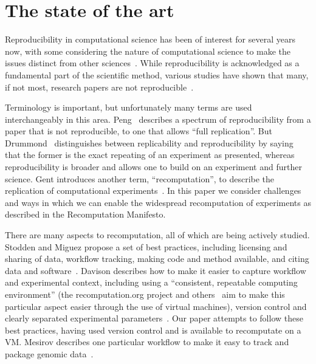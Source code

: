 \section{The state of the art}
\label{s:recomputation}

Reproducibility in computational science has been of interest for
several years now, with some considering the nature of computational
science to make the issues distinct from other
sciences~\cite{donoho:reproducible}. While reproducibility is
acknowledged as a fundamental part of the scientific method, various
studies have shown that many, if not most, research papers are not
reproducible~\cite{bonnet:repeatability,hornbaek:replications,ioannidis:repeatability}.

Terminology is important, but unfortunately many terms are used
interchangeably in this area.  Peng~\cite{peng:reproducible} describes
a spectrum of reproducibility from a paper that is not reproducible,
to one that allows ``full replication''. But
Drummond~\cite{drummond:replicability} distinguishes between
replicability and reproducibility by saying that the former is the
exact repeating of an experiment as presented, whereas reproducibility
is broader and allows one to build on an experiment and further
science. Gent introduces another term, ``recomputation'', to describe
the replication of computational experiments~\cite{gent:recomputation}.
In this paper we consider challenges and ways in which we can enable
the widespread recomputation of experiments as described in the
Recomputation Manifesto.

There are many aspects to recomputation, all of which are being
actively studied. Stodden and Miguez propose a set of best practices,
including licensing and sharing of data, workflow tracking, making
code and method available, and citing data and
software~\cite{stodden:practices}. Davison describes how to make it
easier to capture workflow and experimental context, including using a
``consistent, repeatable computing environment'' (the
recomputation.org project and others~\cite{howe:reproducible} aim to
make this particular aspect easier through the use of virtual
machines), version control and clearly separated experimental
parameters~\cite{davison:reproducibility}. Our paper attempts to
follow these best practices, having used version control and is
available to recomputate on a VM.  Mesirov describes one particular
workflow to make it easy to track and package genomic
data~\cite{mesirov:accessible}.

